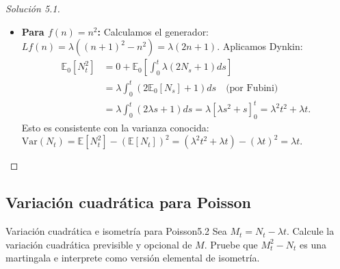 \documentclass[10pt,a4paper]{article}
\begin{document}
\begin{proof}[Solución 5.1]
\begin{itemize}
        \item \textbf{Para $f(n) = n^2$:}
        Calculamos el generador: $Lf(n) = \lambda((n+1)^2 - n^2) = \lambda(2n + 1)$.
        Aplicamos Dynkin:
        \begin{align*}
            \mathbb{E}_0[N_t^2] &= 0 + \mathbb{E}_0 \left[ \int_0^t \lambda(2N_s + 1) ds \right] \\
            &= \lambda \int_0^t (2\mathbb{E}_0[N_s] + 1) ds \quad \text{(por Fubini)} \\
            &= \lambda \int_0^t (2\lambda s + 1) ds = \lambda \left[ \lambda s^2 + s \right]_0^t = \lambda^2 t^2 + \lambda t.
        \end{align*}
        Esto es consistente con la varianza conocida: $\text{Var}(N_t) = \mathbb{E}[N_t^2] - (\mathbb{E}[N_t])^2 = (\lambda^2 t^2 + \lambda t) - (\lambda t)^2 = \lambda t$.
    \end{itemize}
\end{proof}

\newpage
\subsection{Variación cuadrática para Poisson}

\begin{ejercicio}{Variación cuadrática e isometría para Poisson}{5.2}
    Sea $M_t = N_t - \lambda t$. Calcule la variación cuadrática previsible y opcional de $M$. Pruebe que $M_t^2 - N_t$ es una martingala e interprete como versión elemental de isometría.
\end{ejercicio}
\end{document}
